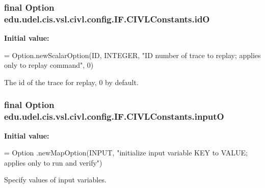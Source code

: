 \subsubsection[{id\+O}]{\setlength{\rightskip}{0pt plus 5cm}final Option edu.\+udel.\+cis.\+vsl.\+civl.\+config.\+I\+F.\+C\+I\+V\+L\+Constants.\+id\+O\hspace{0.3cm}{\ttfamily [static]}}\label{classedu_1_1udel_1_1cis_1_1vsl_1_1civl_1_1config_1_1IF_1_1CIVLConstants_a75d46ae43a99346dffc62bf4668c783b}
{\bfseries Initial value\+:}
\begin{DoxyCode}
= Option.newScalarOption(ID, INTEGER,
            \textcolor{stringliteral}{"ID number of trace to replay; applies only to replay command"}, 0)
\end{DoxyCode}


The id of the trace for replay, 0 by default. 

\hypertarget{classedu_1_1udel_1_1cis_1_1vsl_1_1civl_1_1config_1_1IF_1_1CIVLConstants_a4c3d1e80864a56b12fef813c9cf1457e}{}
\subsubsection[{input\+O}]{\setlength{\rightskip}{0pt plus 5cm}final Option edu.\+udel.\+cis.\+vsl.\+civl.\+config.\+I\+F.\+C\+I\+V\+L\+Constants.\+input\+O\hspace{0.3cm}{\ttfamily [static]}}\label{classedu_1_1udel_1_1cis_1_1vsl_1_1civl_1_1config_1_1IF_1_1CIVLConstants_a4c3d1e80864a56b12fef813c9cf1457e}
{\bfseries Initial value\+:}
\begin{DoxyCode}
= Option
            .newMapOption(INPUT,
                    \textcolor{stringliteral}{"initialize input variable KEY to VALUE; applies only to run and verify"})
\end{DoxyCode}


Specify values of input variables. 

\hypertarget{classedu_1_1udel_1_1cis_1_1vsl_1_1civl_1_1config_1_1IF_1_1CIVLConstants_a3bf647134f0f23bee0244adf7a30c78a}{}
